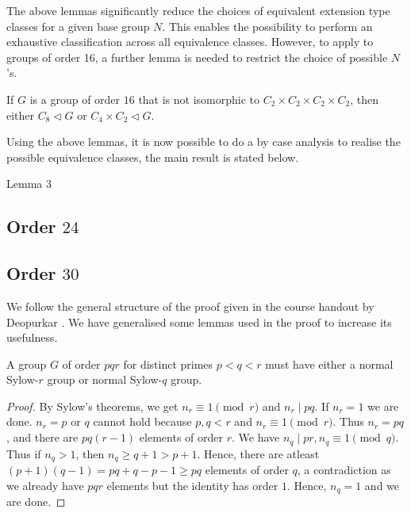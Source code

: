 The above lemmas significantly reduce the choices of equivalent extension type classes for a given base group $N$. This enables the possibility to perform an exhaustive classification across all equivalence classes. However, to apply to groups of order 16, a further lemma is needed to restrict the choice of possible $N$'s.

\begin{lemma}[Wild]
    If $G$ is a group of order $16$ that is not isomorphic to $C_2 \times C_2 \times C_2 \times C_2$, then either $C_8 \lhd G$ or $C_4 \times C_2 \lhd G$.
\end{lemma}

Using the above lemmas, it is now possible to do a by case analysis to realise the possible equivalence classes, the main result is stated below.

\begin{lemma}[Wild]
    Lemma 3
\end{lemma}

\subsection{Order $24$}
\label{Order $24$}

\subsection{Order $30$}
\label{Order $30$}

We follow the general structure of the proof given in the course handout by Deopurkar \cite{deopurkar_modern_2013}. We have generalised some lemmas used in the proof to increase its usefulness.

\begin{theorem}\label{Groups of order $pqr$ have either a normal Sylow-$r$ group or normal Sylow-$q$ group}
    A group $G$ of order $pqr$ for distinct primes $p < q < r$ must have either a normal Sylow-$r$ group or normal Sylow-$q$ group.
\end{theorem}
\begin{proof}
    By Sylow's theorems, we get $n_r \equiv 1 \pmod r$ and $n_r \mid pq$. If $n_r = 1$  we are done. $n_r = p$ or $q$ cannot hold because $p, q < r$ and $n_r \equiv 1 \pmod r$. Thus $n_r = pq$, and there are $pq(r-1)$ elements of order $r$. We have $n_q \mid pr, n_q \equiv 1 \pmod q$. Thus if $n_q > 1$, then $n_q \geq q + 1 > p + 1$. Hence, there are atleast $(p+1)(q-1) = pq + q - p - 1 \geq pq$ elements of order $q$, a contradiction as we already have $pqr$ elements but the identity has order $1$. Hence, $n_q = 1$ and we are done.
\end{proof}

